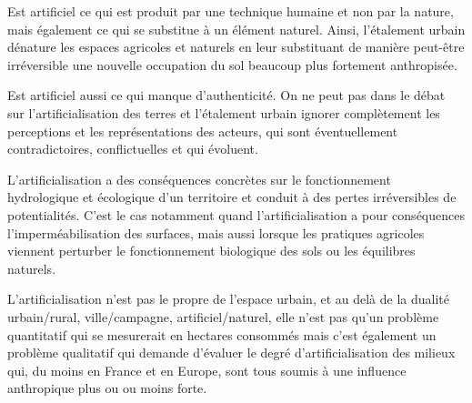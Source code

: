 Est artificiel ce qui est produit par une technique humaine et non par la
nature, mais également ce qui se substitue à un élément naturel. Ainsi,
l’étalement urbain dénature les espaces agricoles et naturels en leur
substituant de manière peut-être irréversible une nouvelle occupation du sol
beaucoup plus fortement anthropisée.

Est artificiel aussi ce qui manque d’authenticité. On ne peut pas dans le
débat sur l'artificialisation des terres et l'étalement urbain ignorer
complètement les perceptions et les représentations des acteurs, qui sont
éventuellement contradictoires, conflictuelles et qui évoluent.

L'artificialisation a des conséquences concrètes sur le fonctionnement
hydrologique et écologique d’un territoire et conduit à des pertes
irréversibles de potentialités. C'est le cas notamment quand
l'artificialisation a pour conséquences l'imperméabilisation des surfaces,
mais aussi lorsque les pratiques agricoles viennent perturber le
fonctionnement biologique des sols ou les équilibres naturels.

L'artificialisation n'est pas le propre de l'espace urbain, et au delà de la
dualité urbain/rural, ville/campagne, artificiel/naturel, elle n'est pas qu'un
problème quantitatif qui se mesurerait en hectares consommés mais c'est
également un problème qualitatif qui demande d'évaluer le degré
d'artificialisation des milieux qui, du moins en France et en Europe, sont
tous soumis à une influence anthropique plus ou ou moins forte.